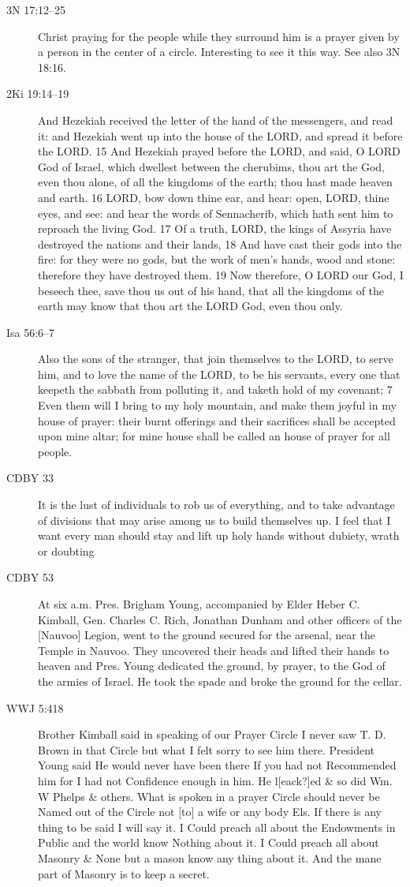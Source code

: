 		\begin{description}
		\item[3N 17:12--25] Christ praying for the people while they surround him is a prayer given by a person in the center of a circle. Interesting to see it this way. See also 3N 18:16.
		\item[2Ki 19:14--19] And Hezekiah received the letter of the hand of the messengers, and read it: and Hezekiah went up into the house of the LORD, and spread it before the LORD. 15 And Hezekiah prayed before the LORD, and said, O LORD God of Israel, which dwellest between the cherubims, thou art the God, even thou alone, of all the kingdoms of the earth; thou hast made heaven and earth. 16 LORD, bow down thine ear, and hear: open, LORD, thine eyes, and see: and hear the words of Sennacherib, which hath sent him to reproach the living God. 17 Of a truth, LORD, the kings of Assyria have destroyed the nations and their lands, 18 And have cast their gods into the fire: for they were no gods, but the work of men's hands, wood and stone: therefore they have destroyed them. 19 Now therefore, O LORD our God, I beseech thee, save thou us out of his hand, that all the kingdoms of the earth may know that thou art the LORD God, even thou only.
		\item[Isa 56:6--7] Also the sons of the stranger, that join themselves to the LORD, to serve him, and to love the name of the LORD, to be his servants, every one that keepeth the sabbath from polluting it, and taketh hold of my covenant; 7 Even them will I bring to my holy mountain, and make them joyful in my house of prayer: their burnt offerings and their sacrifices shall be accepted upon mine altar; for mine house shall be called an house of prayer for all people.
		\item[CDBY 33] It is the lust of individuals to rob us of everything, and to take advantage of divisions that may arise among us to build themselves up. I feel that I want every man should stay and lift up holy hands without dubiety, wrath or doubting
		\item[CDBY 53] At six a.m. Pres. Brigham Young, accompanied by Elder Heber C. Kimball, Gen. Charles C. Rich, Jonathan Dunham and other officers of the [Nauvoo] Legion, went to the ground secured for the arsenal, near the Temple in Nauvoo. They uncovered their heads and lifted their hands to heaven and Pres. Young dedicated the ground, by prayer, to the God of the armies of Israel. He took the spade and broke the ground for the cellar.
		\item[WWJ 5:418] Brother Kimball said in speaking of our Prayer Circle I never saw T. D. Brown in that Circle but what I felt sorry to see him there. President Young said He would never have been there If you had not Recommended him for I had not Confidence enough in him. He l[eack?]ed \& so did Wm. W Phelps \& others. What is spoken in a prayer Circle should never be Named out of the Circle not [to] a wife or any body Els. If there is any thing to be said I will say it. I Could preach all about the Endowments in Public and the world know Nothing about it. I Could preach all about Masonry \& None but a mason know any thing about it. And the mane part of Masonry is to keep a secret.
		\end{description}
		
